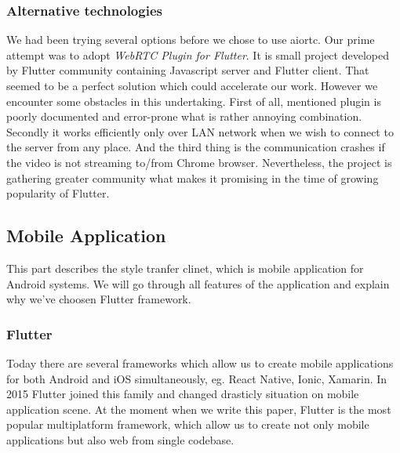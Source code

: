 \documentclass[../Main.tex]{subfiles}
\begin{document}
    \subsubsection{Alternative technologies}
    We had been trying several options before we chose to use aiortc. Our prime attempt was to adopt \textit{WebRTC Plugin for Flutter}. It is small project developed by Flutter community containing Javascript server and Flutter client. That seemed to be a perfect solution which could accelerate our work.
    However we encounter some obstacles in this undertaking. First of all, mentioned plugin is poorly documented and error-prone what is rather annoying combination. Secondly it works efficiently only over LAN network when we wish to connect to the server from any place. And the third thing is the communication crashes if the video is not streaming to/from Chrome browser. Nevertheless, the project is gathering greater community what makes it promising in the time of growing popularity of Flutter.
   
\newpage
\subsection{Mobile Application}
    This part describes the style tranfer clinet, which is mobile application 
    for Android systems. We will go through all features of the application and
    explain why we've choosen Flutter framework. 
    \subsubsection{Flutter}
        Today there are several frameworks which allow us to create mobile 
        applications for both Android and iOS simultaneously, 
        eg. React Native, Ionic, Xamarin.
        In 2015 Flutter joined this family and changed drasticly situation
        on mobile application scene. At the moment when we write this paper,
        Flutter is the most popular multiplatform framework, which allow us to 
        create not only mobile applications but also web from single codebase.
    
\end{document}
